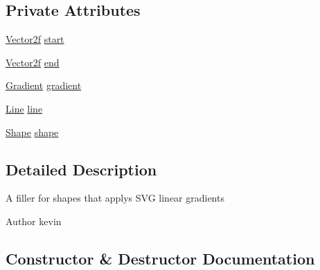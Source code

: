 \subsection*{Private Attributes}
\begin{DoxyCompactItemize}
\item 
\mbox{\hyperlink{classorg_1_1newdawn_1_1slick_1_1geom_1_1_vector2f}{Vector2f}} \mbox{\hyperlink{classorg_1_1newdawn_1_1slick_1_1svg_1_1_linear_gradient_fill_acd016204314fd234afb74aa32282ac7d}{start}}
\item 
\mbox{\hyperlink{classorg_1_1newdawn_1_1slick_1_1geom_1_1_vector2f}{Vector2f}} \mbox{\hyperlink{classorg_1_1newdawn_1_1slick_1_1svg_1_1_linear_gradient_fill_a708d041bfb9a710bdb328561eacd169e}{end}}
\item 
\mbox{\hyperlink{classorg_1_1newdawn_1_1slick_1_1svg_1_1_gradient}{Gradient}} \mbox{\hyperlink{classorg_1_1newdawn_1_1slick_1_1svg_1_1_linear_gradient_fill_a91933ccdb47076eca69f1ebe6886933c}{gradient}}
\item 
\mbox{\hyperlink{classorg_1_1newdawn_1_1slick_1_1geom_1_1_line}{Line}} \mbox{\hyperlink{classorg_1_1newdawn_1_1slick_1_1svg_1_1_linear_gradient_fill_a3c9d1489a824879ba1e0b3a95a08dbda}{line}}
\item 
\mbox{\hyperlink{classorg_1_1newdawn_1_1slick_1_1geom_1_1_shape}{Shape}} \mbox{\hyperlink{classorg_1_1newdawn_1_1slick_1_1svg_1_1_linear_gradient_fill_a8d9085ba4c009c6fce0b06a834ef30e3}{shape}}
\end{DoxyCompactItemize}


\subsection{Detailed Description}
A filler for shapes that applys S\+VG linear gradients

\begin{DoxyAuthor}{Author}
kevin 
\end{DoxyAuthor}


\subsection{Constructor \& Destructor Documentation}
\mbox{\label{classorg_1_1newdawn_1_1slick_1_1svg_1_1_linear_gradient_fill_a84a3511eccce5286be653e3abdeab17c}} 
